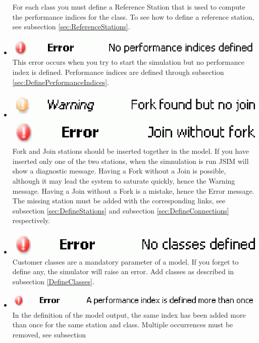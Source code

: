 \begin{description*}
\begin{itemize}
 For each class you must define a Reference Station that is used to compute the performance indices for the class. To see how to define a reference  station, see subsection \ref{sec:ReferenceStations}.
\item \includegraphics[scale=.5]{img/jsim/4.eps}\\
This error occurs when you try to start the simulation but no performance index is defined. Performance indices are defined through subsection \ref{sec:DefinePerformanceIndices}.
\item \includegraphics[scale=.5]{img/jsim/5.eps}\\
\includegraphics[scale=.5]{img/jsim/9.eps}\\
Fork and Join stations should be inserted together in the model. If you have inserted only one of the two stations, when the simnulation is run JSIM will show a diagnostic message. Having a Fork without a Join is possible, although it may lead the system to saturate quickly, hence the Warning message. Having a Join without a Fork is a mistake, hence the Error message. The missing station must be added with the corresponding links, see subsection \ref{sec:DefineStations} and subsection \ref{sec:DefineConnections} respectively.
\item \includegraphics[scale=.5]{img/jsim/6.eps}\\
Customer classes are a mandatory parameter of a model. If you forget to define any, the simulator will raise an error. Add classes as described in subsection \ref{DefineClasses}.
\item \includegraphics[scale=.5]{img/jsim/10.eps}\\
In the definition of the model output, the same index has been added more than once for the same station and class. Multiple occurrences must be removed, see subsection

\end{itemize}
\end{description*}

